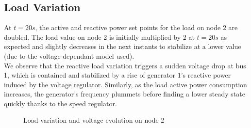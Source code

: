 \documentclass[a4paper, 12pt]{report}
\begin{document}
\newpage
\subsection{Load Variation}
\label{LoadVariation}

At $t=20s$, the active and reactive power set points for the load on node 2 are doubled. The load value on node 2 is initially multiplied by 2 at $t=20s$ as expected and slightly decreases in the next instants to stabilize at a lower value (due to the voltage-dependant model used). \\

We observe that the reactive load variation triggers a sudden voltage drop at bus 1, which is contained and stabilized by a rise of generator 1's reactive power induced by the voltage regulator. Similarly, as the load active power consumption increases, the generator's frequency plummets before finding a lower steady state quickly thanks to the speed regulator.\\

\begin{figure}[H]
\caption{Load variation and voltage evolution on node 2}
\end{figure}
\end{document}
